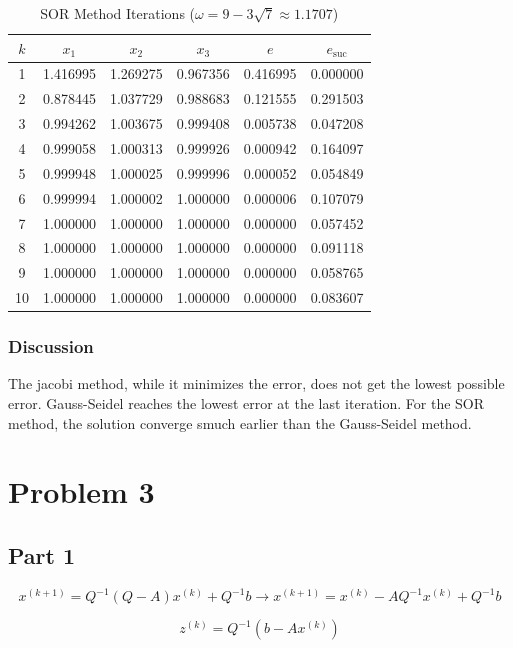 \documentclass{article}
\begin{document}
\begin{table}[htbp]
\centering
\caption{SOR Method Iterations ($\omega = 9 - 3\sqrt{7} \approx 1.1707$)}
\label{tab:sor}
\begin{tabular}{|c c c c c c|}
\toprule
$k$ & $x_1$ & $x_2$ & $x_3$ & $e$ & $e_{\text{suc}}$ \\
\midrule
1  & 1.416995 & 1.269275 & 0.967356 & 0.416995 & 0.000000 \\
2  & 0.878445 & 1.037729 & 0.988683 & 0.121555 & 0.291503 \\
3  & 0.994262 & 1.003675 & 0.999408 & 0.005738 & 0.047208 \\
4  & 0.999058 & 1.000313 & 0.999926 & 0.000942 & 0.164097 \\
5  & 0.999948 & 1.000025 & 0.999996 & 0.000052 & 0.054849 \\
6  & 0.999994 & 1.000002 & 1.000000 & 0.000006 & 0.107079 \\
7  & 1.000000 & 1.000000 & 1.000000 & 0.000000 & 0.057452 \\
8  & 1.000000 & 1.000000 & 1.000000 & 0.000000 & 0.091118 \\
9  & 1.000000 & 1.000000 & 1.000000 & 0.000000 & 0.058765 \\
10 & 1.000000 & 1.000000 & 1.000000 & 0.000000 & 0.083607 \\
\bottomrule
\end{tabular}
\end{table}

\subsubsection*{Discussion}
The jacobi method, while it minimizes the error, does not get the lowest possible error. Gauss-Seidel reaches the lowest error at the last 
iteration. For the SOR method, the solution converge smuch earlier than the Gauss-Seidel method.

\section*{Problem 3}

\subsection*{Part 1}

$$x^{(k+1)} = Q^{-1}(Q-A)x^{(k)}+Q^{-1}b \rightarrow x^{(k+1)} = x^{(k)}-AQ^{-1}x^{(k)}+Q^{-1}b $$

$$z^{(k)} = Q^{-1}(b-Ax^{(k)})$$
\end{document}
